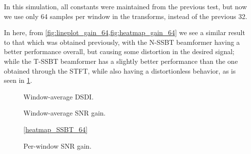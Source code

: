 In this simulation, all constants were maintained from the previous test, but now we use only 64 samples per window in the transforms, instead of the previous 32.

In here, from \cref{fig:lineplot_gain_64,fig:heatmap_gain_64} we see a similar result to that which was obtained previously, with the N-SSBT beamformer having a better performance overall, but causing some distortion in the desired signal; while the T-SSBT beamformer has a slightly better performance than the one obtained through the STFT, while also having a distortionless behavior, as is seen in \cref{fig:lineplot_dsdi_64}.




\begin{figure}[H]
	\centering
	
	\caption{Window-average DSDI.}
	\label{fig:lineplot_dsdi_64}
\end{figure}

\begin{figure}[H]
	\centering
	
	\caption{Window-average SNR gain.}
	\label{fig:lineplot_gain_64}
\end{figure}

\begin{figure}[H]
	\centering
	
	
	\vspace*{0.4em}
	\ref*{heatmap_SSBT_64}
	\caption{Per-window SNR gain.}
	\label{fig:heatmap_gain_64}
\end{figure}



